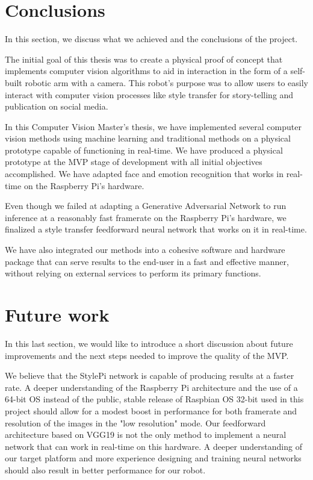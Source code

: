 
\section{Conclusions}

In this section, we discuss what we achieved and the conclusions of the project. 

The initial goal of this thesis was to create a physical proof of concept that implements computer vision algorithms to aid in interaction in the form of a self-built robotic arm with a camera. This robot's purpose was to allow users to easily interact with computer vision processes like style transfer for story-telling and publication on social media.

In this Computer Vision Master's thesis, we have implemented several computer vision methods using machine learning and traditional methods on a physical prototype capable of functioning in real-time. We have produced a physical prototype at the MVP stage of development with all initial objectives accomplished.
We have adapted face and emotion recognition that works in real-time on the Raspberry Pi's hardware.

Even though we failed at adapting a Generative Adversarial Network to run inference at a reasonably fast framerate on the Raspberry Pi's hardware, we finalized a style transfer feedforward neural network that works on it in real-time.  

We have also integrated our methods into a cohesive software and hardware package that can serve results to the end-user in a fast and effective manner, without relying on external services to perform its primary functions.


\section{Future work}

In this last section, we would like to introduce a short discussion about future improvements and the next steps needed to improve the quality of the MVP. 

We believe that the StylePi network is capable of producing results at a faster rate. A deeper understanding of the Raspberry Pi architecture and the use of a 64-bit OS instead of the public, stable release of Raspbian OS 32-bit used in this project should allow for a modest boost in performance for both framerate and resolution of the images in the "low resolution" mode.
Our feedforward architecture based on VGG19 is not the only method to implement a neural network that can work in real-time on this hardware. A deeper understanding of our target platform and more experience designing and training neural networks should also result in better performance for our robot.

